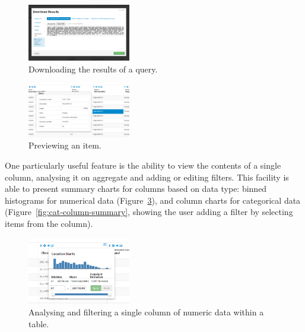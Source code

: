 \documentclass[10pt,a4paper,twocolumn]{article}
\begin{document}
\begin{figure}[htb]
\centering
\includegraphics[width=0.4\textwidth]{table-download.png}
\caption{\label{fig:export} Downloading the results of a query.}
\end{figure}

\begin{figure}[htb]
\centering
\includegraphics[width=0.4\textwidth]{preview-gene.png}
\caption{\label{fig:preview} Previewing an item.}
\end{figure}

One particularly useful feature is the ability to view the contents of a
single column, analysing it on aggregate and adding or editing filters. This
facility is able to present summary charts for columns based on data type:
binned histograms for numerical data (Figure~\ref{fig:column-summary}), and
column charts for categorical data (Figure~\ref{fig:cat-column-summary},
showing the user adding a filter by selecting items from the column).

\begin{figure}[t]
\centering
\includegraphics[width=0.4\textwidth]{im-tables-column-summary.png}
\caption{
    \label{fig:column-summary}
    Analysing and filtering a single column of numeric data within a table.
}
\end{figure}
\end{document}

